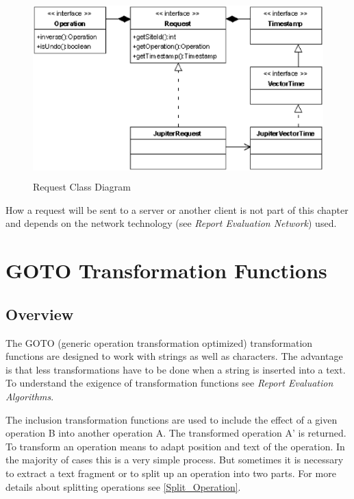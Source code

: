 \begin{figure}[H]
\centering
\includegraphics[height=6.87cm,width=12.09cm]{../../images/algo-impl/request_classdiagram.eps}
\caption{Request Class Diagram}
\label{Request Class Diagram}
\end{figure}

How a request will be sent to a server or another client is not part of this chapter and depends on the network technology (see \emph{Report Evaluation Network}) used.


\section{GOTO Transformation Functions}
\label{GOTO Transformation Functions}

\subsection{Overview}
The GOTO (generic operation transformation optimized) transformation functions are designed to work with strings as well as characters. The advantage is that less transformations have to be done when a string is inserted into a text. To understand the exigence of transformation functions see \emph{Report Evaluation Algorithms}.

The inclusion transformation functions are used to include the effect of a given operation B into another operation A. The transformed operation A' is returned. To transform an operation means to adapt position and text of the operation. In the majority of cases this is a very simple process. But sometimes it is necessary to extract a text fragment or to split up an operation into two parts. For more details about splitting operations see \ref{Split_Operation}.

